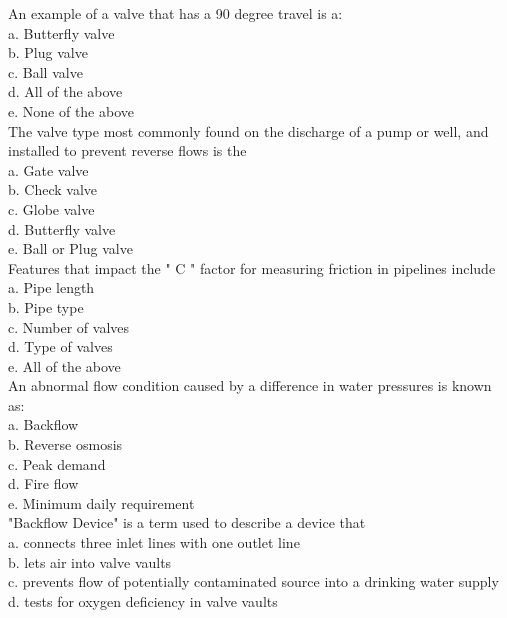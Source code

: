   An example of a valve that has a 90 degree travel is a:\\
a. Butterfly valve\\
b. Plug valve\\
c. Ball valve\\
d. All of the above\\
e. None of the above\\

  The valve type most commonly found on the discharge of a pump or well, and installed to prevent reverse flows is the\\
a. Gate valve\\
b. Check valve\\
c. Globe valve\\
d. Butterfly valve\\
e. Ball or Plug valve\\

  Features that impact the " C " factor for measuring friction in pipelines include\\
a. Pipe length\\
b. Pipe type\\
c. Number of valves\\
d. Type of valves\\
e. All of the above\\

  An abnormal flow condition caused by a difference in water pressures is known as:\\
a. Backflow\\

b. Reverse osmosis\\

c. Peak demand\\

d. Fire flow\\

e. Minimum daily requirement\\

"Backflow Device" is a term used to describe a device that\\
a. connects three inlet lines with one outlet line\\

b. lets air into valve vaults\\

c. prevents flow of potentially contaminated source into a drinking water supply\\

d. tests for oxygen deficiency in valve vaults\\

